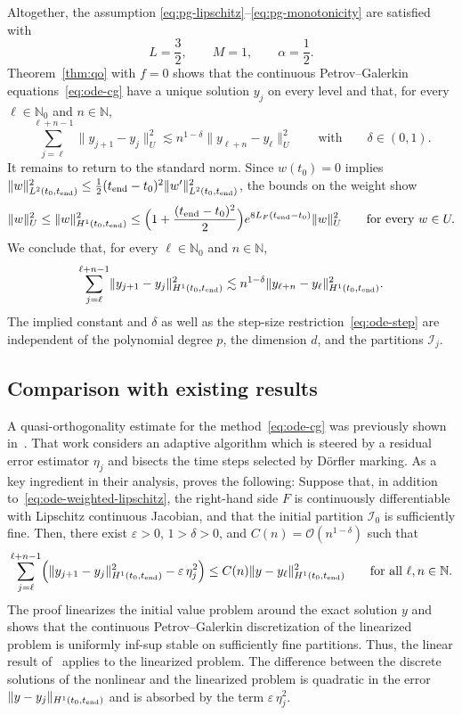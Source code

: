 \documentclass[10pt,reqno]{amsart}
\theoremstyle{definition}
\theoremstyle{remark}
\newcommand{\N}{\mathbb N}
\newcommand{\Nzero}{\mathbb N_0}
\newcommand{\norm}[1]{\lVert #1\rVert}
\begin{document}
\noindent
Altogether, the assumption \eqref{eq:pg-lipschitz}--\eqref{eq:pg-monotonicity} are satisfied with
\[
  L=\frac32,\qquad M=1,\qquad
  \alpha=\frac12.
\]
Theorem~\ref{thm:qo} with $f=0$ shows that the continuous Petrov--Galerkin equations~\eqref{eq:ode-cg} have a unique solution $y_j$ on every level and that, for every $\ell\in\Nzero$ and $n\in\N$,
\[
  \sum_{j=\ell}^{\ell+n-1}\norm{y_{j+1}-y_j}_U^2
  \lesssim n^{1-\delta}\norm{y_{\ell+n}-y_\ell}_U^2
  \qquad\text{with}\qquad
  \delta \in (0,1).
\]
It remains to return to the standard norm. Since $w(t_0)=0$ implies $\norm{w}_{L^2(t_0,t_{\rm end})}^2\le\frac12(t_{\rm end}-t_0)^2\norm{w'}_{L^2(t_0,t_{\rm end})}^2$, the bounds on the weight show
\[
  \norm{w}_U^2\le\norm{w}_{H^1(t_0,t_{\rm end})}^2
  \le\Bigl(1+\frac{(t_{\rm end}-t_0)^2}{2}\Bigr)e^{8L_F(t_{\rm end}-t_0)}\norm{w}_U^2
  \qquad\text{for every }w\in U.
\]
We conclude that, for every $\ell\in\Nzero$ and $n\in\N$,
\begin{equation}\label{eq:ode-qo}
  \sum_{j=\ell}^{\ell+n-1}\norm{y_{j+1}-y_j}_{H^1(t_0,t_{\rm end})}^2
  \lesssim n^{1-\delta}\norm{y_{\ell+n}-y_\ell}_{H^1(t_0,t_{\rm end})}^2.
\end{equation}
The implied constant and $\delta$ as well as the step-size restriction~\eqref{eq:ode-step} are independent of the polynomial degree $p$, the dimension $d$, and the partitions $\mathcal I_j$.

\subsection{Comparison with existing results}
\noindent
A quasi-orthogonality estimate for the method~\eqref{eq:ode-cg} was previously shown in~\cite{adaptive_ode}. That work considers an adaptive algorithm which is steered by a residual error estimator $\eta_j$ and bisects the time steps selected by D\"orfler marking.  As a key ingredient in their analysis, \cite[Lemma~12]{adaptive_ode} proves the following: Suppose that, in addition to~\eqref{eq:ode-weighted-lipschitz}, the right-hand side $F$ is continuously differentiable with Lipschitz continuous Jacobian, and that the initial partition $\mathcal I_0$ is sufficiently fine. Then, there exist $\varepsilon>0$, $1>\delta>0$, and $C(n)=\mathcal O(n^{1-\delta})$ such that
\[
  \sum_{j=\ell}^{\ell+n-1}\Bigl(\norm{y_{j+1}-y_j}_{H^1(t_0,t_{\rm end})}^2-\varepsilon\,\eta_j^2\Bigr)
  \le C(n)\norm{y-y_\ell}_{H^1(t_0,t_{\rm end})}^2
  \qquad\text{for all }\ell,n\in\N.
\]
The proof linearizes the initial value problem around the exact solution $y$ and shows that the continuous Petrov--Galerkin discretization of the linearized problem is uniformly inf-sup stable on sufficiently fine partitions. Thus, the linear result of~\cite{infsup} applies to the linearized problem. The difference between the discrete solutions of the nonlinear and the linearized problem is quadratic in the error $\norm{y-y_j}_{H^1(t_0,t_{\rm end})}$ and is absorbed by the term $\varepsilon\,\eta_j^2$.
\end{document}
